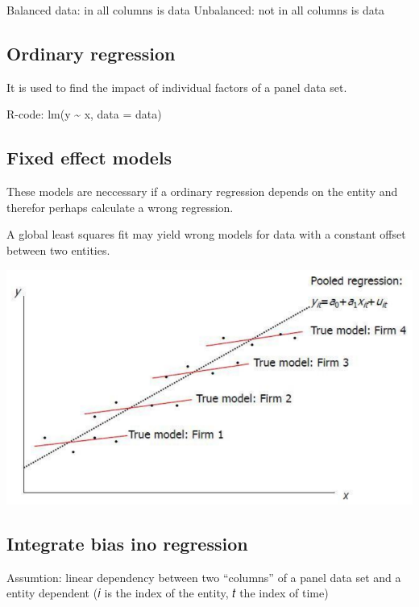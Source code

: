 \documentclass[
]{article}
\begin{document}
Balanced data: in all columns is data Unbalanced: not in all columns is
data

\hypertarget{ordinary-regression}{%
\subsection{Ordinary regression}\label{ordinary-regression}}

It is used to find the impact of individual factors of a panel data set.

R-code: lm(y \textasciitilde{} x, data = data)

\hypertarget{fixed-effect-models}{%
\subsection{Fixed effect models}\label{fixed-effect-models}}

These models are neccessary if a ordinary regression depends on the
entity and therefor perhaps calculate a wrong regression.

A global least squares fit may yield wrong models for data with a
constant offset between two entities.

\includegraphics[width=1\linewidth]{fix}

\hypertarget{integrate-bias-ino-regression}{%
\subsection{Integrate bias ino
regression}\label{integrate-bias-ino-regression}}

Assumtion: linear dependency between two ``columns'' of a panel data set
and a entity dependent (𝑖 is the index of the entity, 𝑡 the index of
time)
\end{document}
